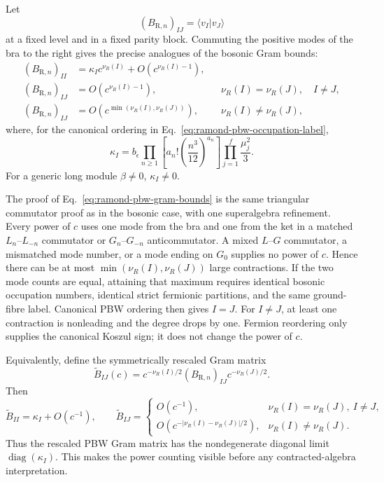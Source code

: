 \documentclass[11pt]{article}
\newcommand{\R}{\mathrm R}
\begin{document}
Let
\begin{equation}
 (B_{\R,n})_{IJ}=\langle v_I|v_J\rangle
 \label{eq:ramond-pbw-gram-entry}
\end{equation}
at a fixed level and in a fixed parity block.  Commuting the positive modes
of the bra to the right gives the precise analogues of the bosonic Gram
bounds:
\begin{equation}
 \boxed{
 \begin{aligned}
 (B_{\R,n})_{II}
 &=\kappa_I c^{\nu_R(I)}
   +O\!\left(c^{\nu_R(I)-1}\right),\\
 (B_{\R,n})_{IJ}
 &=O\!\left(c^{\nu_R(I)-1}\right),
 &&\nu_R(I)=\nu_R(J),\quad I\ne J,\\
 (B_{\R,n})_{IJ}
 &=O\!\left(c^{\min(\nu_R(I),\nu_R(J))}\right),
 &&\nu_R(I)\ne\nu_R(J),
 \end{aligned}}
 \label{eq:ramond-pbw-gram-bounds}
\end{equation}
where, for the canonical ordering in
Eq.~\eqref{eq:ramond-pbw-occupation-label},
\begin{equation}
 \kappa_I
 =b_\epsilon
 \prod_{n\geq1}
  \left[a_n!\left(\frac{n^3}{12}\right)^{a_n}\right]
 \prod_{j=1}^{f}\frac{\mu_j^2}{3}.
 \label{eq:ramond-pbw-leading-diagonal}
\end{equation}
For a generic long module \(\beta\ne0\), \(\kappa_I\ne0\).

The proof of Eq.~\eqref{eq:ramond-pbw-gram-bounds} is the same triangular
commutator proof as in the bosonic case, with one superalgebra refinement.
Every power of \(c\) uses one mode from the bra and one from the ket in a
matched \(L_n\)--\(L_{-n}\) commutator or
\(G_n\)--\(G_{-n}\) anticommutator.  A mixed \(L\)--\(G\) commutator, a
mismatched mode number, or a mode ending on \(G_0\) supplies no power of
\(c\).  Hence there can be at most
\(\min(\nu_R(I),\nu_R(J))\) large contractions.  If the two mode counts
are equal, attaining that maximum requires identical bosonic occupation
numbers, identical strict fermionic partitions, and the same ground-fibre
label.  Canonical PBW ordering then gives \(I=J\).  For \(I\ne J\), at
least one contraction is nonleading and the degree drops by one.  Fermion
reordering only supplies the canonical Koszul sign; it does not change the
power of \(c\).

Equivalently, define the symmetrically rescaled Gram matrix
\begin{equation}
 \widetilde B_{IJ}(c)
 =c^{-\nu_R(I)/2}(B_{\R,n})_{IJ}c^{-\nu_R(J)/2}.
 \label{eq:ramond-rescaled-gram}
\end{equation}
Then
\begin{equation}
 \widetilde B_{II}=\kappa_I+O(c^{-1}),
 \qquad
 \widetilde B_{IJ}=
 \begin{cases}
 O(c^{-1}),&\nu_R(I)=\nu_R(J),\ I\ne J,\\
 O\!\left(c^{-|\nu_R(I)-\nu_R(J)|/2}\right),
 &\nu_R(I)\ne\nu_R(J).
 \end{cases}
 \label{eq:ramond-rescaled-gram-limit}
\end{equation}
Thus the rescaled PBW Gram matrix has the nondegenerate diagonal limit
\(\operatorname{diag}(\kappa_I)\).  This makes the power counting visible
before any contracted-algebra interpretation.
\end{document}
